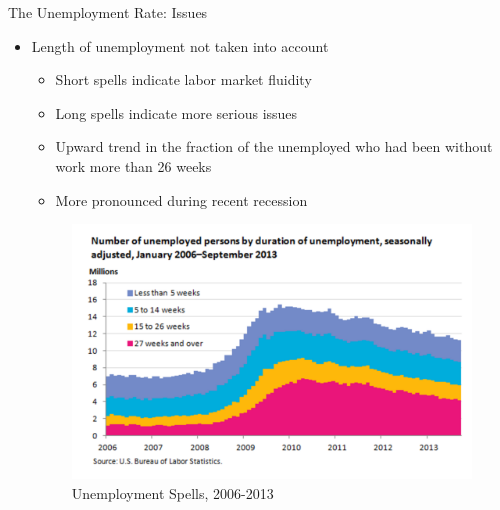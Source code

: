 \documentclass[xcolor={dvipsnames},pdf, hyperref={colorlinks=true, citecolor=ForestGreen, linkcolor=BlueViolet, urlcolor=Magenta}]{beamer}
\theoremstyle{definition}
\begin{document}
\begin{frame}{The Unemployment Rate: Issues}
	\begin{itemize}
		\item Length of unemployment not taken into account
		\begin{itemize}
			\item Short spells indicate labor market fluidity
			\item Long spells indicate more serious issues
			\item Upward trend in the fraction of the unemployed who had been without work more than 26 weeks 
			\item More pronounced during recent recession
		\end{itemize}
		\begin{figure}
			\centering
			\includegraphics[scale=.5]{01C_4.png}
			\caption{Unemployment Spells, 2006-2013}
		\end{figure}	
	\end{itemize}
\end{frame}	
\end{document}
